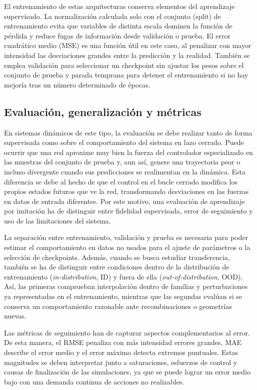El entrenamiento de estas arquitecturas conserva elementos del aprendizaje 
supervisado. La normalización calculada solo con el conjunto (split) de
entrenamiento evita que variables de distinta escala dominen la función de pérdida
y reduce fugas de información desde validación o prueba. El error cuadrático medio 
(MSE) es una función útil en este caso, al penalizar con mayor intensidad las desviaciones
grandes entre la predicción y la realidad. También se emplea validación para seleccionar un
checkpoint sin ajustar los pesos sobre el conjunto de prueba y parada temprana para 
detener el entrenamiento si no hay mejoría tras un número determinado de épocas.

\subsection{Evaluación, generalización y métricas}

En sistemas dinámicos de este tipo, la evaluación se debe realizar tanto de forma
supervisada como sobre el comportamiento del sistema en lazo cerrado. Puede ocurrir que
una red aproxime muy bien la fuerza del controlador especializado en las muestras del
conjunto de prueba y, aun así, genere una trayectoria peor o incluso divergente cuando 
sus predicciones se realimentan en la dinámica. Esta diferencia se debe al hecho de que 
el control en el bucle cerrado modifica los propios estados futuros que ve la red,
transformando desviaciones en las fuerzas en datos de entrada diferentes. Por este
motivo, una evaluación de aprendizaje por imitación ha de distinguir entre fidelidad 
supervisada, error de seguimiento y uso de las limitaciones del sistema.

La separación entre entrenamiento, validación y prueba es necesaria para poder estimar
el comportamiento en datos no usados para el ajuste de parámetros o la selección de
checkpoints. Además, cuando se busca estudiar transferencia, también se ha de distinguir
entre condiciones dentro de la distribución de entrenamiento (\textit{in-distribution}, ID) 
y fuera de ella (\textit{out-of-distribution}, OOD). Así, las primeras comprueban
interpolación dentro de familias y perturbaciones ya representadas en el entrenamiento,
mientras que las segundas evalúan si se conserva un comportamiento razonable ante
recombinaciones o geometrías nuevas. 

Las métricas de seguimiento han de capturar aspectos complementarios al error. De esta
manera, el RMSE penaliza con más intensidad errores grandes, MAE describe el error medio 
y el error máximo detecta extremos puntuales. Estas magnitudes se deben interpretar
junto a saturaciones, esfuerzos de control y causas de finalización de las simulaciones,
ya que se puede lograr un error medio bajo con una demanda continua de acciones no 
realizables. 

